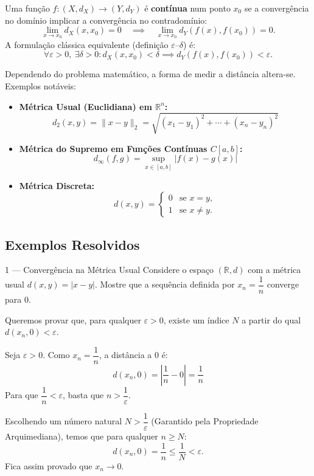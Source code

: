 \begin{defbox}[title={Continuidade em Espaços Métricos}]
  Uma função $f:(X,d_X)\to (Y,d_Y)$ é \textbf{contínua} num ponto $x_0$ se a convergência no domínio implicar a convergência no contradomínio:
  \[
    \lim_{x\to x_0} d_X(x,x_0)=0 \quad \implies \quad \lim_{x\to x_0} d_Y(f(x),f(x_0)) = 0.
  \]
  A formulação clássica equivalente (definição $\varepsilon$--$\delta$) é:
  \[
    \forall \varepsilon>0,\ \exists \delta>0: d_X(x,x_0)<\delta \implies d_Y(f(x), f(x_0))<\varepsilon.
  \]
\end{defbox}

\begin{notebox}[title={Métricas Importantes}]
  Dependendo do problema matemático, a forma de medir a distância altera-se. Exemplos notáveis:
  \begin{itemize}
      \item \textbf{Métrica Usual (Euclidiana) em $\mathbb{R}^n$:}  
      \[
        d_2(x,y)=\|x-y\|_2 = \sqrt{(x_1-y_1)^2+\cdots+(x_n-y_n)^2}
      \]
      \item \textbf{Métrica do Supremo em Funções Contínuas $C[a,b]$:}  
      \[
        d_\infty(f,g)=\sup_{x\in[a,b]} |f(x)-g(x)|
      \]
      \item \textbf{Métrica Discreta:}  
      \[
        d(x,y)=
        \begin{cases}
        0 & \text{se } x=y,\\
        1 & \text{se } x\neq y.
        \end{cases}
      \]
  \end{itemize}
\end{notebox}

\subsection{Exemplos Resolvidos}

\begin{exbox}{1 --- Convergência na Métrica Usual}
  Considere o espaço $(\mathbb{R}, d)$ com a métrica usual $d(x,y)=|x-y|$. Mostre que a sequência definida por $x_n = \dfrac{1}{n}$ converge para $0$.
\end{exbox}
\begin{solbox}
  Queremos provar que, para qualquer $\varepsilon>0$, existe um índice $N$ a partir do qual $d(x_n, 0) < \varepsilon$.
  
  Seja $\varepsilon>0$. Como $x_n=\dfrac{1}{n}$, a distância a $0$ é:
  \[
    d(x_n,0) = \left|\frac{1}{n}-0\right| = \frac{1}{n}
  \]
  Para que $\dfrac{1}{n} < \varepsilon$, basta que $n > \dfrac{1}{\varepsilon}$. 
  
  Escolhendo um número natural $N > \dfrac{1}{\varepsilon}$ (Garantido pela Propriedade Arquimediana), temos que para qualquer $n \ge N$:
  \[
    d(x_n,0) = \frac{1}{n} \le \frac{1}{N} < \varepsilon.
  \]
  Fica assim provado que $x_n \to 0$. \checkmark
\end{solbox}

